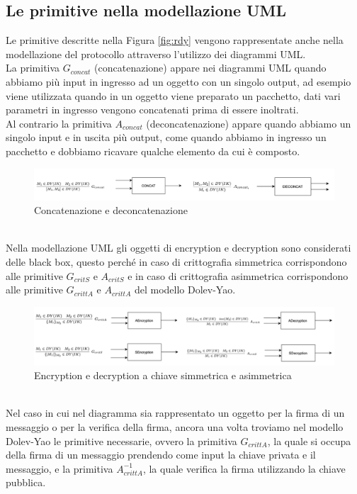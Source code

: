 \subsection{Le primitive nella modellazione UML}

Le primitive descritte nella Figura \ref{fig:rdy} vengono rappresentate anche nella modellazione del protocollo attraverso l'utilizzo dei diagrammi UML.\\
La primitiva $G_{concat}$ (concatenazione) appare nei diagrammi UML quando abbiamo più input in ingresso ad un oggetto con un singolo output, ad esempio viene utilizzata quando in un oggetto viene preparato un pacchetto, dati vari parametri in ingresso vengono concatenati prima di essere inoltrati.\\
Al contrario la primitiva $A_{concat}$ (deconcatenazione) appare quando abbiamo un singolo input e in uscita più output, come quando abbiamo in ingresso un pacchetto e dobbiamo ricavare qualche elemento da cui è composto.\\
\begin{figure}[h!] 
    \centering 
        \includegraphics[width=\textwidth]{../img/1.png} 
        \caption{Concatenazione e deconcatenazione} 
\end{figure}\\
Nella modellazione UML gli oggetti di encryption e decryption sono considerati delle black box, questo perch\'e in caso di crittografia simmetrica corrispondono alle primitive $G_{critS}$ e $A_{critS}$ e in caso di crittografia asimmetrica corrispondono alle primitive $G_{crittA}$ e $A_{crittA}$ del modello Dolev-Yao.\\
\begin{figure}[h!] 
    \centering 
        \includegraphics[width=\textwidth]{../img/2.png} 
        \caption{Encryption e decryption a chiave simmetrica e asimmetrica} 
\end{figure}\\
Nel caso in cui nel diagramma sia rappresentato un oggetto per la firma di un messaggio o per la verifica della firma, ancora una volta troviamo nel modello Dolev-Yao le primitive necessarie, ovvero la primitiva  $G_{crittA}$, la quale si occupa della firma di un messaggio prendendo come input la chiave privata e il messaggio, e la primitiva $A^{-1}_{crittA}$, la quale verifica la firma utilizzando la chiave pubblica.\\
